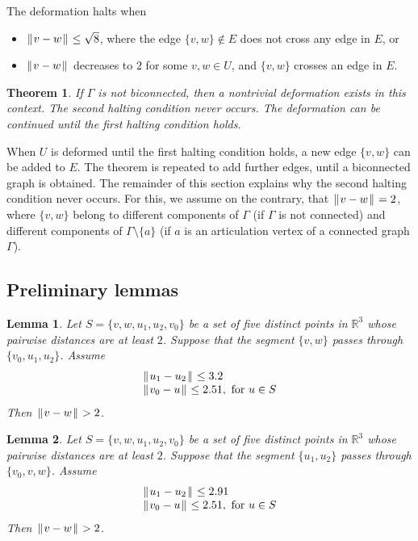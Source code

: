 \documentclass[11pt]{amsart}
\newcommand{\ring}[1]{\mathbb{#1}}
\def\text{\hbox}
\def\|{{\hskip0.1em|\hskip-0.1em|\hskip0.1em}}
\newtheorem{thm}{Theorem}
\newtheorem{lemma}{Lemma}
\begin{document}
The deformation halts when 
\begin{itemize}
\item $\|v-w\|\le\sqrt8$, where the edge $\{v,w\}\not\in E$ does not cross any edge in $E$, or
\item $\|v-w\|$ decreases to $2$ for some $v,w\in U$, and $\{v,w\}$ crosses an edge in $E$.
\end{itemize}

\begin{thm}  If $\Gamma$ is not biconnected, then a nontrivial deformation exists in this context. 
The second halting condition never occurs.  The deformation can be continued until the first halting
condition holds.
\end{thm}

When $U$ is deformed until the first halting condition holds, a new edge $\{v,w\}$ can be added to $E$.
The theorem is repeated to add further edges, until a biconnected graph is obtained.  
The remainder of this section explains why the second halting condition never occurs.  For
this, we assume on the contrary, that $\|v-w\|=2$, where $\{v,w\}$ belong to different components
of $\Gamma$ (if $\Gamma$ is not connected) and different components of $\Gamma\setminus\{a\}$ (if $a$
is an articulation vertex of a connected graph $\Gamma$). 

\subsection*{Preliminary lemmas}

\begin{lemma}  Let $S=\{v,w,u_1,u_2,v_0\}$ be a set of five distinct points in $\ring{R}^3$ whose
pairwise distances are at least $2$. Suppose that the segment $\{v,w\}$ passes through
$\{v_0,u_1,u_2\}$. Assume
$$
\begin{array}{lll}
\|u_1-u_2\|\le 3.2\\
\|v_0-u\|\le 2.51,\text{ for } u \in S\\
\end{array}
$$
Then $\|v-w\|>2$.
\end{lemma}

\begin{lemma}  Let $S=\{v,w,u_1,u_2,v_0\}$ be a set of five distinct points in $\ring{R}^3$ whose
pairwise distances are at least $2$. Suppose that the segment $\{u_1,u_2\}$ passes through
$\{v_0,v,w\}$. Assume
$$
\begin{array}{lll}
\|u_1-u_2\|\le 2.91\\
\|v_0-u\|\le 2.51,\text{ for } u \in S\\
\end{array}
$$
Then $\|v-w\|>2$.
\end{lemma}
\end{document}
